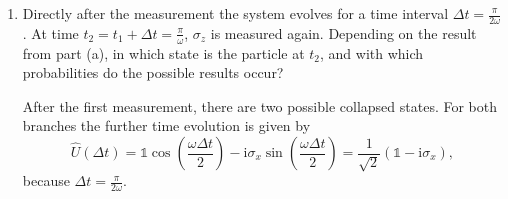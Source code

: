 \documentclass[11pt,a4paper]{scrartcl}
\newcommand{\abs}[1]{\left| #1 \right|}
\newcommand{\ii}{\mathrm{i}}
\newcommand{\op}[1]{\hat{#1}}
\begin{document}
\begin{enumerate}[label=(\alph*)]
\begin{calculationbox}
            \begin{calculationbox}
                \begin{align*}
                    P(+1) &= \abs{\braket{\uparrow|\psi(t_1)}}^2
                    = \abs{-\frac{\ii}{\sqrt{2}}}^2
                    = \frac12, \\
                    P(-1) &= \abs{\braket{\downarrow|\psi(t_1)}}^2
                    = \abs{\frac{1}{\sqrt{2}}}^2
                    = \frac12.
                \end{align*}
            \end{calculationbox}
        \end{calculationbox}

        \begin{answerbox}
            Immediately before the measurement,
            \[
                \boxed{\ket{\psi(t_1)}=\frac{1}{\sqrt{2}}\left(\ket{\downarrow}-\ii\ket{\uparrow}\right)}.
            \]
            A measurement of $\sigma_z$ gives
            \[
                \boxed{+1 \text{ with probability } \frac12, \qquad -1 \text{ with probability } \frac12.}
            \]
            After the measurement the state collapses to $\ket{\uparrow}$ if the result was $+1$, and to $\ket{\downarrow}$ if the result was $-1$.
        \end{answerbox}

        \item Directly after the measurement the system evolves for a time interval $\Delta t=\frac{\pi}{2\omega}$. At time $t_2=t_1+\Delta t=\frac{\pi}{\omega}$, $\sigma_z$ is measured again. Depending on the result from part (a), in which state is the particle at $t_2$, and with which probabilities do the possible results occur?

        \begin{calculationbox}
            After the first measurement, there are two possible collapsed states. For both branches the further time evolution is given by
            \[
                \op{U}(\Delta t)
                = \mathbb{1}\cos\left(\frac{\omega\Delta t}{2}\right)
                -\ii\sigma_x\sin\left(\frac{\omega\Delta t}{2}\right)
                = \frac{1}{\sqrt{2}}(\mathbb{1}-\ii\sigma_x),
            \]
            because $\Delta t=\frac{\pi}{2\omega}$.


\end{calculationbox}
\end{enumerate}
\end{document}

